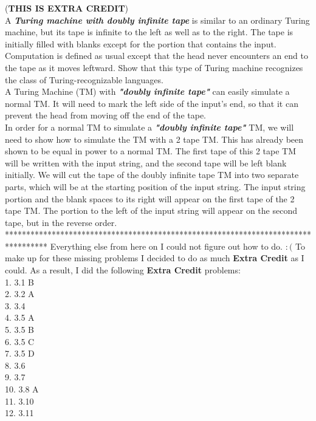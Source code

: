 \documentclass[12pt]{article}
\begin{document}

 (\textbf{THIS IS EXTRA CREDIT}) \\

A \textbf{\textit{Turing machine with doubly infinite tape}} is similar to an ordinary 
Turing machine, but its tape is infinite to the left as well as to the right. 
The tape is initially filled with blanks except for the portion that contains the input. 
Computation is defined as usual except that the head never encounters an end to the tape 
as it moves leftward. Show that this type of Turing machine recognizes the class of
Turing-recognizable languages. \\

A Turing Machine (TM) with \textbf{\textit{"doubly infinite tape"}} can easily
simulate a normal TM. It will need to mark the left side of the input's end, so
that it can prevent the head from moving off the end of the tape. \\

In order for a normal TM to simulate a \textbf{\textit{"doubly infinite tape"}} TM,
we will need to show how to simulate the TM with a 2 tape TM. This has already been
shown to be equal in power to a normal TM. The first tape of this 2 tape TM will be
written with the input string, and the second tape will be left blank initially.
We will cut the tape of the doubly infinite tape TM into two separate parts, which
will be at the starting position of the input string. The input string portion and
the blank spaces to its right will appear on the first tape of the 2 tape TM. The
portion to the left of the input string will appear on the second tape, but in
the reverse order. \\

\pagebreak
**********************************************************************************
Everything else from here on I could not figure out how to do. $:($
To make up for these missing problems I decided to do as much \textbf{Extra Credit}
as I could. As a result, I did the following \textbf{Extra Credit} problems: \\

 1. 3.1 B \\
 2. 3.2 A \\
 3. 3.4 \\
 4. 3.5 A \\
 5. 3.5 B \\
 6. 3.5 C \\
 7. 3.5 D \\
 8. 3.6 \\ 
 9. 3.7 \\
10. 3.8 A \\ 
11. 3.10 \\
12. 3.11 \\
\end{document}
